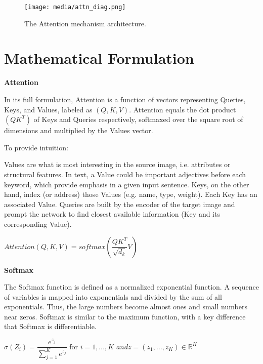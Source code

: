 \begin{figure}[H]
	\begin{center}
	\texttt{[image: media/attn\_diag.png]}
	\end{center}
	\caption[Attention Mechanism]{The Attention mechanism architecture. \citep{GoogleViT}}
	\end{figure}


\section{Mathematical Formulation}

\textbf{Attention}


In its full formulation, Attention is a function of vectors representing Queries, Keys, and Values, 
labeled as $(Q,K,V)$. 
Attention equals the dot product $(QK^T)$ of Keys and Queries respectively, softmaxed over 
the square root of dimensions and multiplied by the Values vector.

To provide intuition:

Values are what is most interesting in the source image, i.e. 
attributes or structural features. In text, a Value could be important adjectives before each keyword, 
which provide emphasis in a given input sentence.
Keys, on the other hand, index (or address) those Values (e.g. name, type, weight). 
Each Key has an associated Value. 
Queries are built by the encoder of the target image and prompt the network to find closest 
available information (Key and its corresponding Value). 

\begin{center}
	$ Attention(Q, K, V) = softmax(\dfrac{QK^T}{\sqrt{d_k}} V ) $
	\end{center}



\vspace{10mm}

\textbf{Softmax}


The Softmax function is defined as a normalized exponential function. 
A sequence of variables is mapped into exponentials and divided by the sum of all exponentials. 
Thus, the large numbers become almost ones and small numbers near zeros. Softmax is similar to the maximum 
function, with a key difference that Softmax is differentiable. 

\begin{center}
	$ \displaystyle\sigma(Z_i) = \dfrac{e^{z_j}}{\sum_{j=1}^K e^{z_j}}$ for $i=1,...,K$ $and z=(z_1,...,z_K) \in \mathbb{R}^K $
	\end{center}

